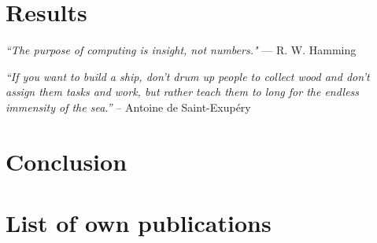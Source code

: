 \documentclass[a4paper,12pt]{report}
\begin{document}
%
%
\chapter{Results}
\hfill \textit{``The purpose of computing is insight, not numbers."} --- R. W. Hamming


\hfill \textit{``If you want to build a ship, don’t drum up people to collect wood and don't assign them tasks and work, but rather teach them to long for the endless immensity of the sea.''} -- Antoine de Saint-Exup\'{e}ry
\chapter{Conclusion}


\label{endtext} 

\printbibliography

\chapter*{List of own publications}

\label{enddocument} 
\end{document}

